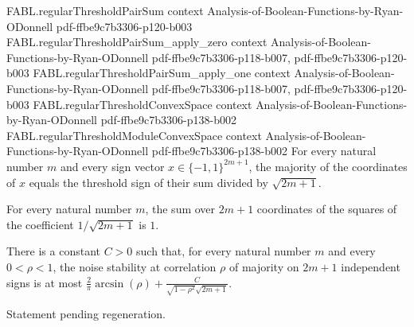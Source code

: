 \begin{theorem}
\proofstep
  {FABL.regularThresholdPairSum}
  {context}
  {Analysis-of-Boolean-Functions-by-Ryan-ODonnell}
  {pdf-ffbe9c7b3306-p120-b003}
\proofstep
  {FABL.regularThresholdPairSum_apply_zero}
  {context}
  {Analysis-of-Boolean-Functions-by-Ryan-ODonnell}
  {pdf-ffbe9c7b3306-p118-b007,
    pdf-ffbe9c7b3306-p120-b003}
\proofstep
  {FABL.regularThresholdPairSum_apply_one}
  {context}
  {Analysis-of-Boolean-Functions-by-Ryan-ODonnell}
  {pdf-ffbe9c7b3306-p118-b007,
    pdf-ffbe9c7b3306-p120-b003}
\proofstep
  {FABL.regularThresholdConvexSpace}
  {context}
  {Analysis-of-Boolean-Functions-by-Ryan-ODonnell}
  {pdf-ffbe9c7b3306-p138-b002}
\proofstep
  {FABL.regularThresholdModuleConvexSpace}
  {context}
  {Analysis-of-Boolean-Functions-by-Ryan-ODonnell}
  {pdf-ffbe9c7b3306-p138-b002}
For every natural number $m$ and every sign vector $x\in\{-1,1\}^{2m+1}$, the majority
of the coordinates of $x$ equals the threshold sign of their sum divided by
$\sqrt{2m+1}$.
\end{theorem}

\begin{theorem}
\label{FABL.sum_normalizedMajorityCoefficient_sq}
\leanok
{}
For every natural number $m$, the sum over $2m+1$ coordinates of the squares of the
coefficient $1/\sqrt{2m+1}$ is $1$.
\end{theorem}

\begin{theorem}
\label{FABL.exists_noiseStability_majority_odd_le_arcsine_add_inv_sqrt}
\leanok
{}
There is a constant $C>0$ such that, for every natural number $m$ and every $0<\rho<1$,
the noise stability at correlation $\rho$ of majority on $2m+1$ independent signs is at
most $\frac{2}{\pi}\arcsin(\rho)+\frac{C}{\sqrt{1-\rho^2}\sqrt{2m+1}}$.
\end{theorem}

\begin{theorem}
\label{FABL.exists_majorityNoiseStability_constant}
\leanok
{}
Statement pending regeneration.
\end{theorem}
